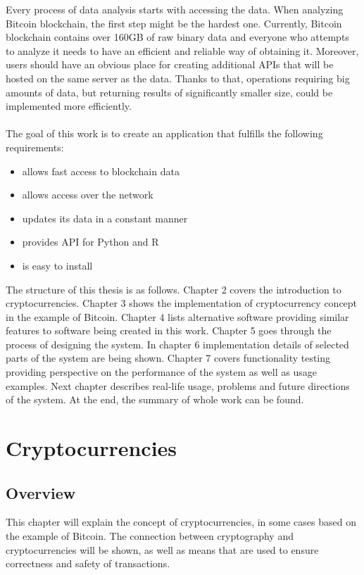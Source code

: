 \documentclass[12pt, en, eng, oneside, final]{mgr}
\begin{document}
Every process of data analysis starts with accessing the data. When analyzing Bitcoin blockchain, the first step might be the hardest one. Currently, Bitcoin blockchain contains over 160GB of raw binary data and everyone who attempts to analyze it needs to have an efficient and reliable way of obtaining it. Moreover, users should have an obvious place for creating additional APIs that will be hosted on the same server as the data. Thanks to that, operations requiring big amounts of data, but returning results of significantly smaller size, could be implemented more efficiently.
\\
\\
The goal of this work is to create an application that fulfills the following requirements: 
\begin{itemize}

\item
allows fast access to blockchain data
\item
allows access over the network
\item
updates its data in a constant manner
\item
provides API for Python and R
\item
is easy to install

\end{itemize}

The structure of this thesis is as follows. Chapter 2 covers the introduction to cryptocurrencies. Chapter 3 shows the implementation of cryptocurrency concept in the example of Bitcoin. Chapter 4 lists alternative software providing similar features to software being created in this work. Chapter 5 goes through the process of designing the system. In chapter 6 implementation details of selected parts of the system are being shown. Chapter 7 covers functionality testing providing perspective on the performance of the system as well as usage examples. Next chapter describes real-life usage, problems and future directions of the system. At the end, the summary of whole work can be found. 

\chapter{Cryptocurrencies}

\section{Overview}
This chapter will explain the concept of cryptocurrencies, in some cases based on the example of Bitcoin. The connection between cryptography and cryptocurrencies will be shown, as well as means that are used to ensure correctness and safety of transactions.
\end{document}
